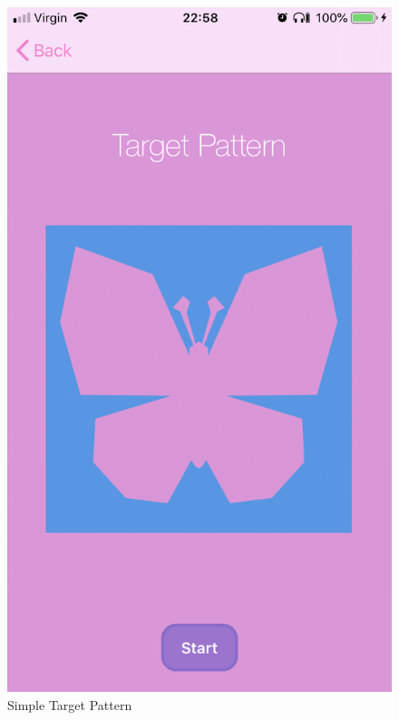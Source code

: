 \documentclass[11pt]{article}
\begin{document}
            \begin{figure}[!ht]
                        \begin{minipage}{0.45\textwidth}
                            \centering \includegraphics[width=0.7\linewidth]{KiriZen/simpleTarget.png}
                            \caption{Simple Target Pattern}
                            \label{fig:kiriZen-simpleTarget}
                        \end{minipage}\hfill
                        \begin{minipage}{0.45\textwidth}
                            \centering

\end{minipage}
\end{figure}
\end{document}
